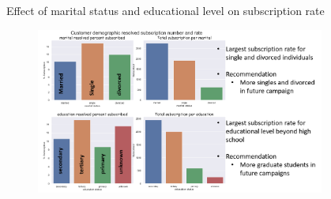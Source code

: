 \begin{frame}{Effect of marital status and educational level on subscription rate}


	\begin{figure}
		
		\includegraphics[width=9.50cm]{figures/fig_marital_education_rate.png}
	\end{figure}


\end{frame}


